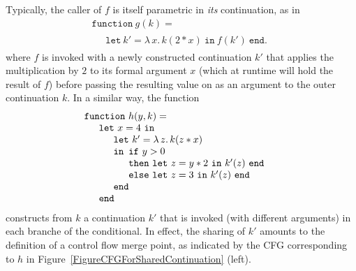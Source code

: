 Typically, the caller of $f$ is itself parametric in \emph{its}
continuation, as in
\begin{equation}
\label{ContinuationCode3}
\begin{array}{l}
\mathtt{function}\ g (k) =\\
\quad
\begin{array}{l}
\mathtt{let}\ k' = \lambda\, x .\, k (2*x)\ \mathtt{in}\ f(k')\ \mathtt{end}.
\end{array}
\end{array}
\end{equation}
where $f$ is invoked with a newly constructed continuation $k'$ that
applies the multiplication by $2$ to its formal
argument $x$ (which at runtime will hold the result of $f$) before
passing the resulting value on as an argument to the outer
continuation $k$.
In a similar way, the function
\begin{equation}
\label{ContinuationCode4}
\begin{array}{l}
\mathtt{function}\ h (y, k) =\\
\quad
  \begin{array}{l}
    \mathtt{let}\ x=4\ \mathtt{in} \\
    \quad \begin{array}{l}
            \mathtt{let}\ k' = \lambda\, z .\, k (z*x)\\
            \mathtt{in}
               \begin{array}[t]{l}
                 \mathtt{if}\ y>0\\
                 \mathtt{then\ let}\ z = y*2\ \mathtt{in}\ k'(z)\ \mathtt{end}\\
                 \mathtt{else\ let}\ z = 3\ \mathtt{in}\ k'(z)\ \mathtt{end}
               \end{array}\\
            \mathtt{end}
          \end{array} \\
    \mathtt{end}
  \end{array}
\end{array}
\end{equation}
constructs from $k$ a continuation $k'$ that is invoked (with
different arguments) in each branche of the conditional. In effect,
the sharing of $k'$ amounts to the definition of a control flow merge
point, as indicated by the CFG corresponding to $h$ in
Figure~\ref{FigureCFGForSharedContinuation} (left).

